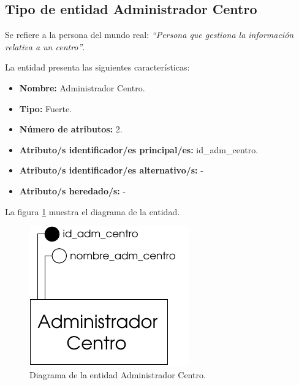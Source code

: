 \subsection{Tipo de entidad Administrador Centro}

   \begin{description}

   \item[Definición] Se refiere a la persona del mundo real: \emph{``Persona
   que gestiona la información relativa a un centro''}.

   \item[Características] La entidad presenta las siguientes características:
      \begin{itemize}
         \item \textbf{Nombre:} Administrador Centro.
         \item \textbf{Tipo:} Fuerte.
         \item \textbf{Número de atributos:} 2.
         \item \textbf{Atributo/s identificador/es principal/es:} id\_adm\_centro.
         \item \textbf{Atributo/s identificador/es alternativo/s:} -
         \item \textbf{Atributo/s heredado/s:} -
      \end{itemize}

   \item[Diagrama] La figura \ref{diagramaAdminCentro} muestra el diagrama de la entidad.
   \item \begin{figure}[!ht]
            \begin{center}
            \includegraphics[]{07.Modelo_Entidad-Interrelacion/7.2.Analisis_Entidades/diagramas/adm_centro.pdf}
            \caption{Diagrama de la entidad Administrador Centro.}
            \label{diagramaAdminCentro}
            \end{center}
         \end{figure}


\end{description}
